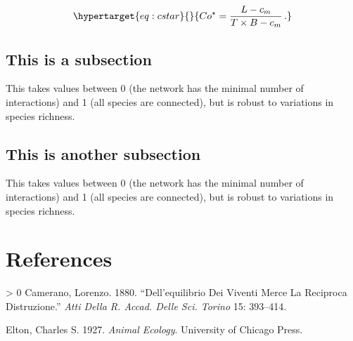\documentclass[10pt,oneside]{article}
\newlength{\cslhangindent}
\newenvironment{CSLReferences}[3] %
 {%
  \setlength{\parindent}{0pt}
  \ifodd #1 \everypar{\setlength{\hangindent}{\cslhangindent}}\ignorespaces\fi
  \ifnum #2 > 0
  \setlength{\parskip}{#2\baselineskip}
  \fi
 }%
 {}
\begin{document}
\begin{equation}\protect\hypertarget{eq:cstar}{}{Co^\star=\frac{L-c_m}{T\times B-c_m} \,.}\label{eq:cstar}\end{equation}

\hypertarget{this-is-a-subsection}{%
\subsection{This is a subsection}\label{this-is-a-subsection}}

This takes values between 0 (the network has the minimal number of
interactions) and 1 (all species are connected), but is robust to
variations in species richness.

\hypertarget{this-is-another-subsection}{%
\subsection{This is another
subsection}\label{this-is-another-subsection}}

This takes values between 0 (the network has the minimal number of
interactions) and 1 (all species are connected), but is robust to
variations in species richness.

\hypertarget{references}{%
\section*{References}\label{references}}

\hypertarget{refs}{}
\begin{CSLReferences}{1}{0}
\leavevmode\hypertarget{ref-Camerano1880EquViv}{}%
Camerano, Lorenzo. 1880. {``Dell'equilibrio Dei Viventi Merce La
Reciproca Distruzione.''} \emph{Atti Della R. Accad. Delle Sci. Torino}
15: 393--414.

\leavevmode\hypertarget{ref-Elton1927AniEco}{}%
Elton, Charles S. 1927. \emph{Animal Ecology}. University of Chicago
Press.

\end{CSLReferences}
\end{document}
